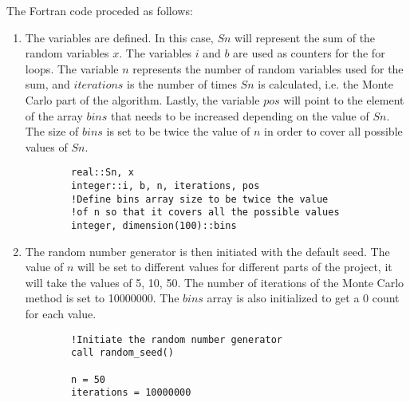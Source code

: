 \documentclass[12pt]{article}
\begin{document}
The Fortran code proceded as follows:

\begin{enumerate}
	\item The variables are defined. In this case, $Sn$ will represent the sum of the random variables $x$. The variables $i$ and $b$ are used as counters for the for loops. The variable $n$ represents the number of random variables used for the sum, and $iterations$ is the number of times $Sn$ is calculated, i.e. the Monte Carlo part of the algorithm. Lastly, the variable $pos$ will point to the element of the array $bins$ that needs to be increased depending on the value of $Sn$. The size of $bins$ is set to be twice the value of $n$ in order to cover all possible values of $Sn$.
	\begin{lstlisting}
		real::Sn, x
		integer::i, b, n, iterations, pos
		!Define bins array size to be twice the value 
		!of n so that it covers all the possible values
		integer, dimension(100)::bins
	\end{lstlisting}
	\item The random number generator is then initiated with the default seed. The value of $n$ will be set to different values for different parts of the project, it will take the values of 5, 10, 50. The number of iterations of the Monte Carlo method is set to 10000000. The $bins$ array is also initialized to get a 0 count for each value. 
	\begin{lstlisting}
		!Initiate the random number generator
		call random_seed()

		n = 50
		iterations = 10000000


\end{lstlisting}
\end{enumerate}
\end{document}
